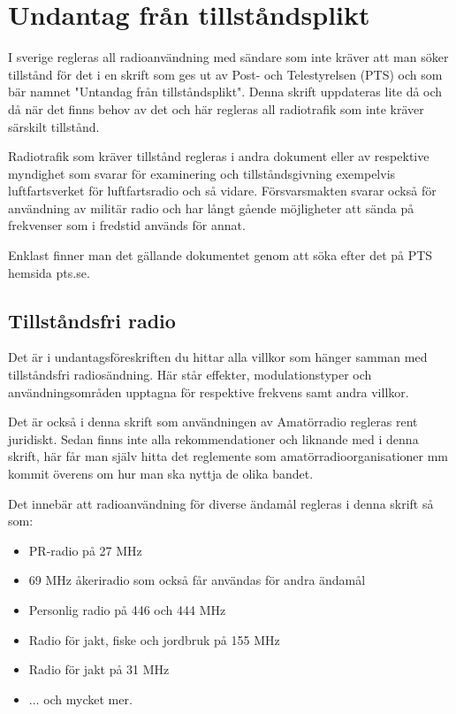 
\section{Undantag från tillståndsplikt}

I sverige regleras all radioanvändning med sändare som inte kräver att man söker tillstånd för det i en skrift som ges ut av Post- och Telestyrelsen (PTS) och som bär namnet "Untandag från tillståndsplikt". Denna skrift uppdateras lite då och då när det finns behov av det och här regleras all radiotrafik som inte kräver särskilt tillstånd. 

Radiotrafik som kräver tillstånd regleras i andra dokument eller av respektive myndighet som svarar för examinering och tillståndsgivning exempelvis luftfartsverket för luftfartsradio och så vidare. Försvarsmakten svarar också för användning av militär radio och har långt gående möjligheter att sända på frekvenser som i fredstid används för annat.

Enklast finner man det gällande dokumentet genom att söka efter det på PTS hemsida pts.se.

\subsection{Tillståndsfri radio}

Det är i undantagsföreskriften du hittar alla villkor som hänger samman med tillståndsfri radiosändning. Här står effekter, modulationstyper och användningsområden upptagna för respektive frekvens samt andra villkor.

Det är också i denna skrift som användningen av Amatörradio regleras rent juridiskt. Sedan finns inte alla rekommendationer och liknande med i denna skrift, här får man själv hitta det reglemente som amatörradioorganisationer mm kommit överens om hur man ska nyttja de olika bandet.

Det innebär att radioanvändning för diverse ändamål regleras i denna skrift så som:

\begin{itemize}
	\item PR-radio på 27 MHz
	\item 69 MHz åkeriradio som också får användas för andra ändamål
	\item Personlig radio på 446 och 444 MHz
	\item Radio för jakt, fiske och jordbruk på 155 MHz
	\item Radio för jakt på 31 MHz
	\item ... och mycket mer.
\end{itemize}


